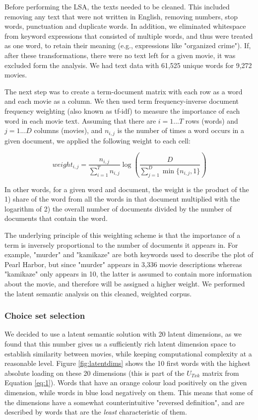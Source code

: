 \documentclass[11pt,a4paper]{article}
\begin{document}
 Before performing the LSA, the texts needed to be cleaned. This included removing any text that were not written in English, removing numbers, stop words, punctuation and duplicate words. In addition, we eliminated whitespace from keyword expressions that consisted of multiple words, and thus were treated as one word, to retain their meaning (e.g., expressions like "organized crime"). If, after these transformations, there were no text left for a given movie, it was excluded form the analysis. We had text data with 61,525 unique words for 9,272 movies.
 
 
 The next step was to create a term-document matrix with each row as a word and each movie as a column. We then used term frequency-inverse document frequency weighting (also known as tf-idf) to measure the importance of each word in each movie text. Assuming that there are $i = 1...T$ rows (words) and  $j = 1...D$ columns (movies), and $n_{i,j}$ is the number of times a word occurs in a given document, we applied the following weight to each cell:
 
 \begin{equation}
weight_{i,j}=\frac{n_{i,j}}{\sum_{i=1}^{T} n_{i,j}}\log{\left(\frac{D}{\sum_{j=1}^{D} \min\{n_{i,j},1\}}\right)}
\end{equation}
 
 In other words, for a given word and document, the weight is the product of the 1) share of the word from all the words in that document multiplied with the logarithm of 2) the overall number of documents divided by the number of documents that contain the word.  
  
  The underlying principle of this weighting scheme is that the importance of a term is inversely proportional to the number of documents it appears in. For example, "murder" and "kamikaze" are both keywords used to describe the plot of Pearl Harbor, but since "murder" appears in 3,336 movie descriptions whereas "kamikaze" only appears in 10, the latter is assumed to contain more information about the movie, and therefore will be assigned a higher weight. We performed the latent semantic analysis on this cleaned, weighted corpus.


\subsubsection{Choice set selection} \label{choice_selection}

We decided to use a latent semantic solution with 20 latent dimensions, as we found that this number gives us a sufficiently rich latent dimension space to establish similarity between movies, while keeping computational complexity at a reasonable level. Figure \ref{fig:latentdims} shows the 10 first words with the highest absolute loading on these 20 dimensions (this is part of the $U_{Txk}$ matrix from Equation \ref{eq:1}). Words that have an orange colour load positively on the given dimension, while words in blue load negatively on them. This means that some of the dimensions have a somewhat counterintuitive "reversed definition", and are described by words that are the \textit{least} characteristic of them. 
\end{document}
